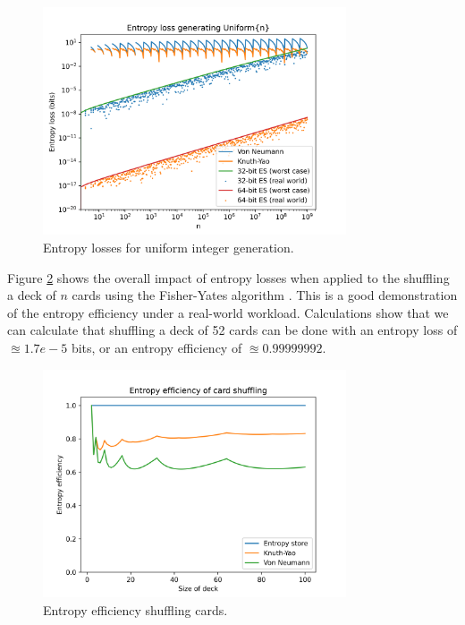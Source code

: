 \documentclass[12pt]{article}
\begin{document}
\begin{figure}[ht]
\centering
\includegraphics[width=0.8\textwidth]{uniform_losses.png}
\caption{Entropy losses for uniform integer generation.}
\label{fig:uniform-losses}
\end{figure}

Figure \ref{fig:shuffling-efficiency} shows the overall impact of entropy losses when applied to the shuffling a deck of $n$ cards using the Fisher-Yates algorithm \cite{fisher1953statistical, durstenfeld1964algorithm, knuth2014art}. This is a good demonstration of the entropy efficiency under a real-world workload. Calculations show that we can calculate that shuffling a deck of 52 cards can be done with an entropy loss of $\approxeq 1.7e-5$ bits, or an entropy efficiency of $\approxeq 0.99999992$.

\begin{figure}[ht]
\centering
\includegraphics[width=0.8\textwidth]{shuffling_efficiency.png}
\caption{Entropy efficiency shuffling cards.}
\label{fig:shuffling-efficiency}
\end{figure}
\end{document}
